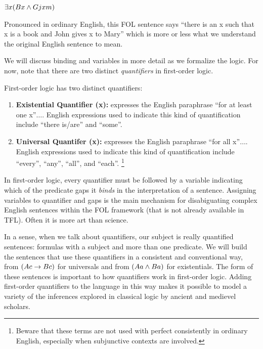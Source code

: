 \begin{argument}
\item[ ] $\exists x(Bx\wedge Gjxm)$
\end{argument}

Pronounced in ordinary English, this FOL sentence says ``there is an x such that
x is a book and John gives x to Mary'' which is more or less what we understand
the original English sentence to mean.

We will discuss binding and variables in more detail as we formalize the logic.
For now, note that there are two distinct \emph{quantifiers} in first-order
logic.

\begin{definition}
  \label{def:fol-quantifiers-informal}
  First-order logic has two distinct quantifiers:
  \begin{enumerate}
  \item \textbf{Existential Quantifier (\eexists x):} expresses the English
    paraphrase ``for at least one x''$\dots$. English expressions used to
    indicate this kind of quantification include ``there is/are'' and ``some''. 
  \item \textbf{Universal Quantifer (\eforall x):} expresses the English
    paraphrase ``for all x''$\dots$. English expressions used to indicate this
    kind of quantification include ``every'', ``any'', ``all'', and ``each''.
    \footnote{Beware that these terms are not used with perfect consistently
      in ordinary English, especially when subjunctive contexts are involved.}
  \end{enumerate}
  In first-order logic, every quantifier must be followed by a variable
  indicating which of the predicate gaps it \emph{binds} in the interpretation
  of a sentence. Assigning variables to quantifier and gaps is the main
  mechanism for disabiguating complex English sentences within the FOL
  framework (that is not already available in TFL). Often it is more art than
  science.
\end{definition}

In a sense, when we talk about quantifiers, our subject is really quantified
sentences: formulas with a subject and more than one predicate. We will build
the sentences that use these quantifiers in a consistent and conventional way,
from $(Ac \rightarrow Bc)$ for universals and from $(Aa \wedge Ba)$ for existentials.
The form of these sentences is important to how quantifiers work in first-order
logic. Adding first-order quantifiers to the language in this way makes it
possible to model a variety of the inferences explored in classical logic by
ancient and medievel scholars.

